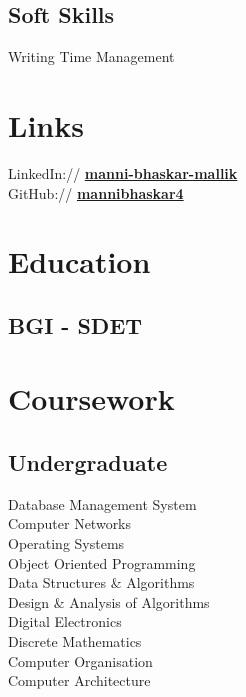 \documentclass[]{deedy-resume-openfont}
\begin{document}
\begin{minipage}[t]{0.33\textwidth}
\subsection{Soft Skills}
 Writing \textbullet{} Time Management
\sectionsep


\section{Links} 
LinkedIn://  \href{https://www.linkedin.com/in/manni-bhaskar-mallik/}{\bf manni-bhaskar-mallik} \\
GitHub://  \href{https://github.com/mannibhaskar4}{\bf mannibhaskar4} \\

\sectionsep


\section{Education} 

\subsection{BGI - SDET}
\sectionsep


\section{Coursework}

\subsection{Undergraduate}
\sectionsep
Database Management System \\
Computer Networks \\
Operating Systems \\
Object Oriented Programming \\
Data Structures \& Algorithms \\
Design \& Analysis of Algorithms \\
Digital Electronics \\
Discrete Mathematics \\
Computer Organisation \\
Computer Architecture \\

%
%

\end{minipage} 
\end{document}
